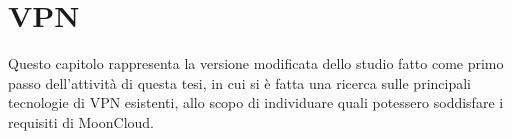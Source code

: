 \chapter{VPN}

Questo capitolo rappresenta la versione modificata dello studio fatto
come primo passo dell'attività di questa tesi, in cui si è fatta una ricerca
sulle principali tecnologie di VPN esistenti, allo scopo di individuare
quali potessero soddisfare i requisiti di MoonCloud.\\







